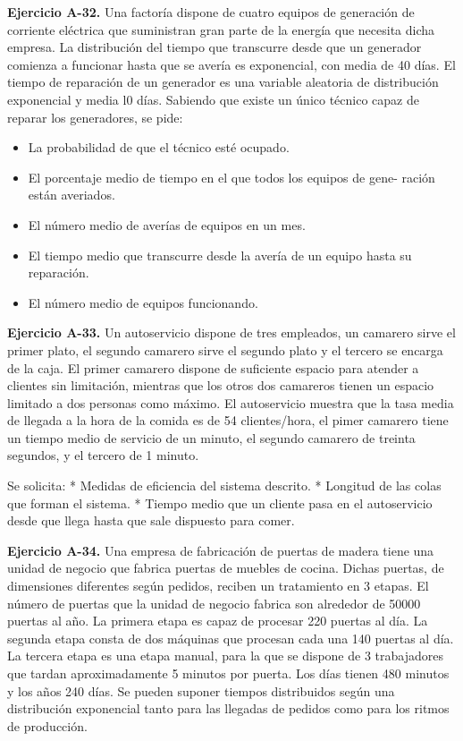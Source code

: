 \documentclass[
]{book}
\providecommand{\tightlist}{%
  \setlength{\itemsep}{0pt}\setlength{\parskip}{0pt}}
\theoremstyle{definition}
\theoremstyle{definition}
\theoremstyle{definition}
\theoremstyle{definition}
\theoremstyle{remark}
\begin{document}
\textbf{Ejercicio A-32.} Una factoría dispone de cuatro equipos de generación de corriente eléctrica que suministran gran parte de la energía que necesita dicha empresa. La distribución del tiempo que transcurre desde que un generador comienza a funcionar hasta que se avería es exponencial, con media de 40 días. El tiempo de reparación de un generador es una variable aleatoria de distribución exponencial y media l0 días. Sabiendo que existe un único técnico capaz de reparar los generadores, se pide:

\begin{itemize}
\tightlist
\item
  La probabilidad de que el técnico esté ocupado.
\item
  El porcentaje medio de tiempo en el que todos los equipos de gene- ración están averiados.
\item
  El número medio de averías de equipos en un mes.
\item
  El tiempo medio que transcurre desde la avería de un equipo hasta su reparación.
\item
  El número medio de equipos funcionando.
\end{itemize}

\textbf{Ejercicio A-33.} Un autoservicio dispone de tres empleados, un camarero sirve el primer plato, el segundo camarero sirve el segundo plato y el tercero se encarga de la caja. El primer camarero dispone de suficiente espacio para atender a clientes sin limitación, mientras que los otros dos camareros tienen un espacio limitado a dos personas como máximo. El autoservicio muestra que la tasa media de llegada a la hora de la comida es de 54 clientes/hora, el pimer camarero tiene un tiempo medio de servicio de un minuto, el segundo camarero de treinta segundos, y el tercero de 1 minuto.

Se solicita:
* Medidas de eficiencia del sistema descrito.
* Longitud de las colas que forman el sistema.
* Tiempo medio que un cliente pasa en el autoservicio desde que llega hasta que sale dispuesto para comer.

\textbf{Ejercicio A-34.} Una empresa de fabricación de puertas de madera tiene una unidad de negocio que fabrica puertas de muebles de cocina. Dichas puertas, de dimensiones diferentes según pedidos, reciben un tratamiento en 3 etapas. El número de puertas que la unidad de negocio fabrica son alrededor de 50000 puertas al año. La primera etapa es capaz de procesar 220 puertas al día. La segunda etapa consta de dos
máquinas que procesan cada una 140 puertas al día. La tercera etapa es una etapa manual, para la que se dispone de 3 trabajadores que tardan aproximadamente 5 minutos por puerta. Los días tienen 480 minutos y los años 240 días. Se pueden suponer tiempos distribuidos según una distribución exponencial tanto para las llegadas de pedidos como para los ritmos de producción.
\end{document}
